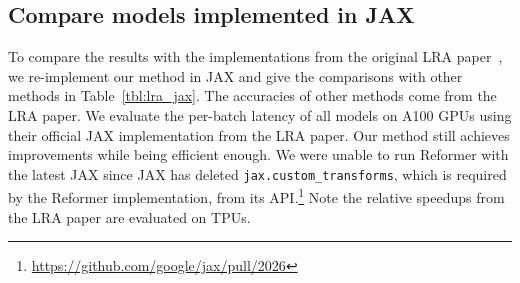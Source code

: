 \subsection{Compare models implemented in JAX}
\label{appendix:lra_jax}
To compare the results with the implementations from the original LRA paper~\citep{tay2020long}, we re-implement our method in JAX and give the comparisons with other methods in Table~\ref{tbl:lra_jax}.
The accuracies of other methods come from the LRA paper. We evaluate the per-batch latency of all models on A100 GPUs using their official JAX implementation from the LRA paper. Our method still achieves improvements while being efficient enough. We were unable to run Reformer with the latest JAX since JAX has deleted \texttt{jax.custom\_transforms}, which is required by the Reformer implementation, from its API.\footnote{\url{https://github.com/google/jax/pull/2026}} Note the relative speedups from the LRA paper are evaluated on TPUs.
